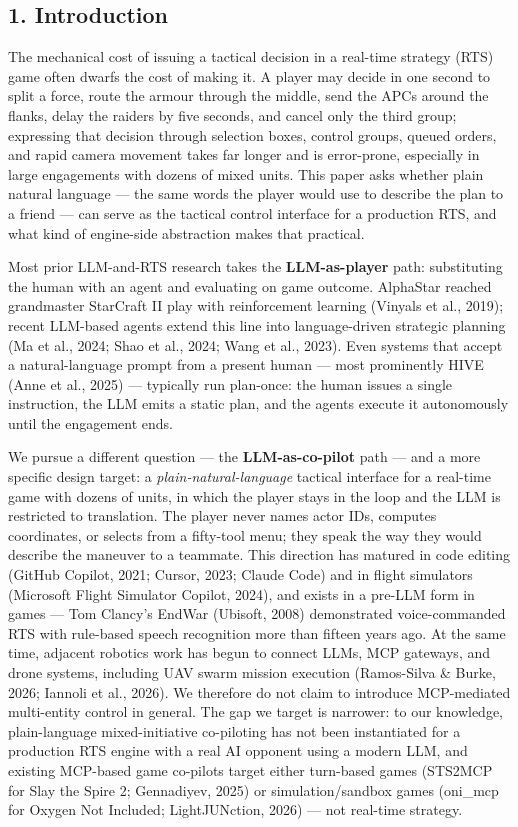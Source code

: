 \documentclass[
  journal]{IEEEtran}
\begin{document}
\subsection{1. Introduction}\label{introduction}

The mechanical cost of issuing a tactical decision in a real-time
strategy (RTS) game often dwarfs the cost of making it. A player may
decide in one second to split a force, route the armour through the
middle, send the APCs around the flanks, delay the raiders by five
seconds, and cancel only the third group; expressing that decision
through selection boxes, control groups, queued orders, and rapid camera
movement takes far longer and is error-prone, especially in large
engagements with dozens of mixed units. This paper asks whether plain
natural language --- the same words the player would use to describe the
plan to a friend --- can serve as the tactical control interface for a
production RTS, and what kind of engine-side abstraction makes that
practical.

Most prior LLM-and-RTS research takes the \textbf{LLM-as-player} path:
substituting the human with an agent and evaluating on game outcome.
AlphaStar reached grandmaster StarCraft II play with reinforcement
learning (Vinyals et al., 2019); recent LLM-based agents extend this
line into language-driven strategic planning (Ma et al., 2024; Shao et
al., 2024; Wang et al., 2023). Even systems that accept a
natural-language prompt from a present human --- most prominently HIVE
(Anne et al., 2025) --- typically run plan-once: the human issues a
single instruction, the LLM emits a static plan, and the agents execute
it autonomously until the engagement ends.

We pursue a different question --- the \textbf{LLM-as-co-pilot} path ---
and a more specific design target: a \emph{plain-natural-language}
tactical interface for a real-time game with dozens of units, in which
the player stays in the loop and the LLM is restricted to translation.
The player never names actor IDs, computes coordinates, or selects from
a fifty-tool menu; they speak the way they would describe the maneuver
to a teammate. This direction has matured in code editing (GitHub
Copilot, 2021; Cursor, 2023; Claude Code) and in flight simulators
(Microsoft Flight Simulator Copilot, 2024), and exists in a pre-LLM form
in games --- Tom Clancy's EndWar (Ubisoft, 2008) demonstrated
voice-commanded RTS with rule-based speech recognition more than fifteen
years ago. At the same time, adjacent robotics work has begun to connect
LLMs, MCP gateways, and drone systems, including UAV swarm mission
execution (Ramos-Silva \& Burke, 2026; Iannoli et al., 2026). We
therefore do not claim to introduce MCP-mediated multi-entity control in
general. The gap we target is narrower: to our knowledge, plain-language
mixed-initiative co-piloting has not been instantiated for a production
RTS engine with a real AI opponent using a modern LLM, and existing
MCP-based game co-pilots target either turn-based games (STS2MCP for
Slay the Spire 2; Gennadiyev, 2025) or simulation/sandbox games
(oni\_mcp for Oxygen Not Included; LightJUNction, 2026) --- not
real-time strategy.
\end{document}
